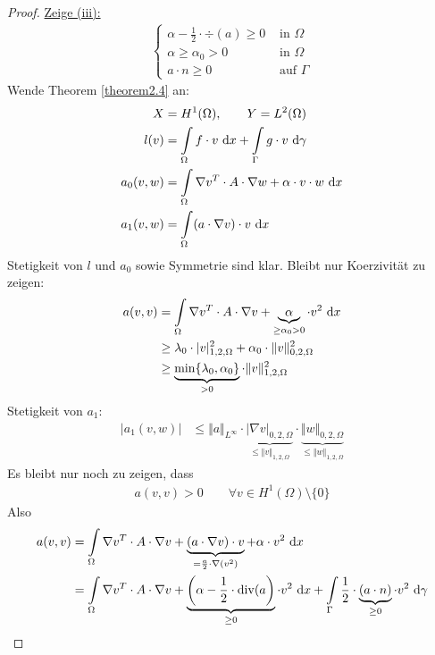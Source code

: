 \begin{proof}
	\underline{Zeige (iii):}
	\begin{align*}
		\left\{\begin{array}{rl}
			\alpha-\frac{1}{2}\cdot\div(a)\geq0&\text{ in }\Omega\\
			\alpha\geq\alpha_0>0&\text{ in }\Omega\\
			a\cdot n\geq0&\text{ auf }\Gamma
		\end{array}\right.
	\end{align*}
	Wende Theorem \ref{theorem2.4} an:
	\begin{align*}
		X&=H^1(\Omega),\qquad Y=L^2(\Omega)\\
		l(v)&=\int\limits_\Omega f\cdot v\text{ d} x+\int\limits_\Gamma g\cdot v\text{ d}\gamma\\
		a_0(v,w)&=\int\limits_\Omega\nabla v^T\cdot A\cdot\nabla w+\alpha\cdot v\cdot w\text{ d} x\\
		a_1(v,w)&=\int\limits_\Omega(a\cdot\nabla v)\cdot v\text{ d} x
	\end{align*}
	Stetigkeit von $l$ und $a_0$ sowie Symmetrie sind klar. Bleibt nur Koerzivität zu zeigen:
	\begin{align*}
		a(v,v)&=\int\limits_\Omega\nabla v^T \cdot A \cdot \nabla v+\underbrace{\alpha}_{\geq\alpha_0>0}\cdot v^2\text{ d} x\\
		&\geq\lambda_0\cdot|v|^2_{1,2,\Omega}+\alpha_0\cdot\Vert v\Vert^2_{0,2,\Omega}\\
		&\geq\underbrace{\min\lbrace\lambda_0,\alpha_0\rbrace}_{>0}\cdot\Vert v\Vert^2_{1,2,\Omega}
	\end{align*}
	Stetigkeit von $a_1$:
	\begin{align*}
		\big| a_1(v,w)\big|&\leq\Vert a\Vert_{L^\infty}\cdot\underbrace{|\nabla v|_{0,2,\Omega}}_{\leq\Vert v\Vert_{1,2,\Omega}}\cdot\underbrace{\Vert w		\Vert_{0,2,\Omega}}_{\leq\Vert w\Vert_{1,2,\Omega}}
	\end{align*}
	Es bleibt nur noch zu zeigen, dass
	\begin{align*}
		a(v,v)>0\qquad\forall v\in H^1(\Omega)\setminus\lbrace0\rbrace
	\end{align*}
	Also
	\begin{align*}
		a(v,v)
		&=\int\limits_{\Omega} \nabla v^T\cdot A\cdot \nabla v+\underbrace{(a\cdot\nabla v)\cdot v}_{=\frac{a}{2}\cdot\nabla(v^2)}+\alpha\cdot v^2\d x\\
		&=\int\limits_{\Omega}\nabla v^T\cdot A\cdot\nabla v+\underbrace{\left(\alpha-\frac{1}{2}\cdot\div(a\right)}_{\geq0}\cdot v^2\d x+\int\limits_\Gamma\frac{1}{2}\cdot\underbrace{(a\cdot n)}_{\geq0}\cdot v^2\d\gamma\\

\end{align*}
\end{proof}
